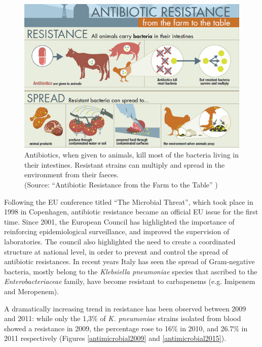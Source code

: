 \documentclass[11pt]{report}
\begin{document}
\begin{figure}[htp]
\centering
\includegraphics[scale=0.57]{img/farm.jpg}
\caption{Antibiotics, when given to animals, kill most of the bacteria living in their intestines.
Resistant strains can multiply and spread in the environment from their faeces.\\
(Source: ``Antibiotic Resistance from the Farm to the Table'' \cite{farm})}
\label{farm}
\end{figure}

\clearpage
Following the EU conference titled ``The Microbial Threat'', which took place in 1998 in Copenhagen, antibiotic resistance became an official EU issue for the first time.
Since 2001, the European Council has highlighted the importance of reinforcing epidemiological surveillance, and improved the supervision of laboratories.
The council also highlighted the need to create a coordinated structure at national level, in order to prevent and control the spread of antibiotic resistances.
In recent years Italy has seen the spread of Gram-negative bacteria, mostly belong to the \emph{Klebsiella pneumoniae} species that ascribed to the \emph{Enterobacteriaceae} family, have become resistant to carbapenems (e.g. Imipenem and Meropenem).

A dramatically increasing trend in resistance has been observed between 2009 and 2011: while only the 1,3$\%$ of \emph{K. pneumoniae} strains isolated from blood showed a resistance in 2009, the percentage rose to 16$\%$ in 2010, and 26.7$\%$ in 2011 respectively (Figures \ref{antimicrobial2009} and \ref{antimicrobial2015}).
\end{document}
